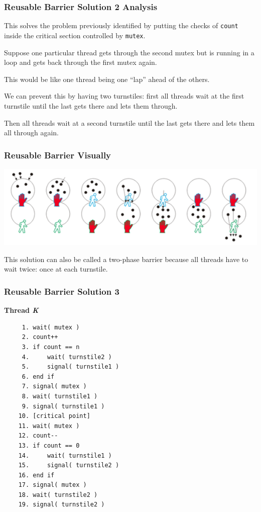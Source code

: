 \begin{frame}
\frametitle{Reusable Barrier Solution 2 Analysis}

This solves the problem previously identified by putting the checks of \texttt{count} inside the critical section controlled by \texttt{mutex}. 

Suppose one particular thread gets through the second mutex but is running in a loop and gets back through the first mutex again. 

This would be like one thread being one ``lap'' ahead of the others. 

We can prevent this by having two turnstiles: first all threads wait at the first turnstile until the last gets there and lets them through. 

Then all threads wait at a second turnstile until the last gets there and lets them all through again. 


\end{frame}

\begin{frame}
\frametitle{Reusable Barrier Visually}

\begin{center}
\includegraphics[width=\textwidth]{images/reusable-barrier.png}
\end{center}

This solution can also be called a \alert{two-phase barrier} because all threads have to wait twice: once at each turnstile.

\end{frame}

\begin{frame}[fragile]
\frametitle{Reusable Barrier Solution 3}
\vspace{-0.5em}
\textbf{Thread \textit{K}}\vspace{-0.5em}
  \begin{verbatim}
	 1. wait( mutex )
	 2. count++
	 3. if count == n
	 4.     wait( turnstile2 )
	 5.     signal( turnstile1 )
	 6. end if
	 7. signal( mutex )
	 8. wait( turnstile1 )
	 9. signal( turnstile1 )
	10. [critical point]
	11. wait( mutex )
	12. count--
	13. if count == 0
	14.     wait( turnstile1 )
	15.     signal( turnstile2 )
	16. end if
	17. signal( mutex )
	18. wait( turnstile2 )
	19. signal( turnstile2 )
  \end{verbatim}
\vspace{-2em}


\end{frame}




